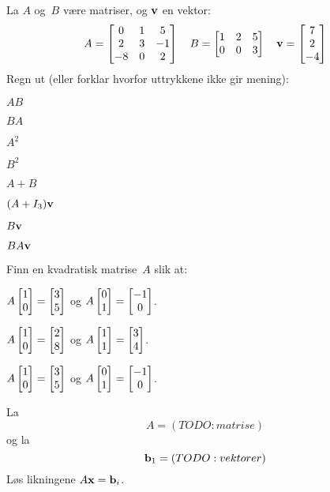
\begin{oppgave}
La $A$ og~$B$ være matriser, og $\mathbf{v}$ en vektor:
\[
A =
\begin{bmatrix}
 0 & 1 &  5 \\
 2 & 3 & -1 \\
-8 & 0 & 2
\end{bmatrix}
\quad
B =
\begin{bmatrix}
1 & 2 & 5 \\
0 & 0 & 3
\end{bmatrix}
\quad
\mathbf{v} = \begin{bmatrix} 7 \\ 2 \\ -4 \end{bmatrix}
\]
Regn ut (eller forklar hvorfor uttrykkene ikke gir mening):
\begin{punkt}
$AB$
\end{punkt}
\begin{punkt}
$BA$
\end{punkt}
\begin{punkt}
$A^2$
\end{punkt}
\begin{punkt}
$B^2$
\end{punkt}
\begin{punkt}
$A+B$
\end{punkt}
\begin{punkt}
$(A + I_3) \mathbf{v}$
\end{punkt}
\begin{punkt}
$B\mathbf{v}$
\end{punkt}
\begin{punkt}
$BA\mathbf{v}$
\end{punkt}
\end{oppgave}


\begin{oppgave}
\end{oppgave}


\begin{oppgave}
Finn en kvadratisk matrise~$A$ slik at:
\begin{punkt}
$A \begin{bmatrix} 1 \\ 0 \end{bmatrix} = \begin{bmatrix} 3 \\ 5 \end{bmatrix}$
og
$A \begin{bmatrix} 0 \\ 1 \end{bmatrix} = \begin{bmatrix} -1 \\ 0 \end{bmatrix}$.
\end{punkt}
\begin{punkt}
$A \begin{bmatrix} 1 \\ 0 \end{bmatrix} = \begin{bmatrix} 2 \\ 8 \end{bmatrix}$
og
$A \begin{bmatrix} 1 \\ 1 \end{bmatrix} = \begin{bmatrix} 3 \\ 4 \end{bmatrix}$.
\end{punkt}
\begin{punkt}
$A \begin{bmatrix} 1 \\ 0 \end{bmatrix} = \begin{bmatrix} 3 \\ 5 \end{bmatrix}$
og
$A \begin{bmatrix} 0 \\ 1 \end{bmatrix} = \begin{bmatrix} -1 \\ 0 \end{bmatrix}$.
\end{punkt}
\end{oppgave}


\begin{oppgave}
La
\[
A = (TODO:matrise)
\]
og la
\[
\mathbf{b}_1 = (TODO:vektorer)
\]
Løs likningene $A \mathbf{x} = \mathbf{b}_i$.
\end{oppgave}


\begin{oppgave}
\end{oppgave}



